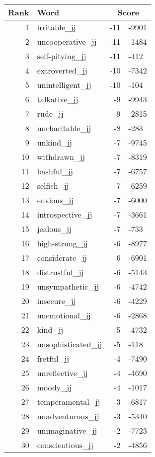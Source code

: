 \begin{longtable}[!htbp]{| rlr@{.}l |}
    \hline
    \textbf{Rank} & \textbf{Word} & \multicolumn{2}{c|}{\textbf{Score}} \\
    \hline
    \endhead
    1 & irritable\_jj & -11 & -9901 \\
    2 & uncooperative\_jj & -11 & -1484 \\
    3 & self-pitying\_jj & -11 & -412 \\
    4 & extroverted\_jj & -10 & -7342 \\
    5 & unintelligent\_jj & -10 & -104 \\
    6 & talkative\_jj & -9 & -9943 \\
    7 & rude\_jj & -9 & -2815 \\
    8 & uncharitable\_jj & -8 & -283 \\
    9 & unkind\_jj & -7 & -9745 \\
    10 & withdrawn\_jj & -7 & -8319 \\
    11 & bashful\_jj & -7 & -6757 \\
    12 & selfish\_jj & -7 & -6259 \\
    13 & envious\_jj & -7 & -6000 \\
    14 & introspective\_jj & -7 & -3661 \\
    15 & jealous\_jj & -7 & -733 \\
    16 & high-strung\_jj & -6 & -8977 \\
    17 & considerate\_jj & -6 & -6901 \\
    18 & distrustful\_jj & -6 & -5143 \\
    19 & unsympathetic\_jj & -6 & -4742 \\
    20 & insecure\_jj & -6 & -4229 \\
    21 & unemotional\_jj & -6 & -2868 \\
    22 & kind\_jj & -5 & -4732 \\
    23 & unsophisticated\_jj & -5 & -118 \\
    24 & fretful\_jj & -4 & -7490 \\
    25 & unreflective\_jj & -4 & -4690 \\
    26 & moody\_jj & -4 & -1017 \\
    27 & temperamental\_jj & -3 & -6817 \\
    28 & unadventurous\_jj & -3 & -5340 \\
    29 & unimaginative\_jj & -2 & -7723 \\
    30 & conscientious\_jj & -2 & -4856 \\

\end{longtable}
